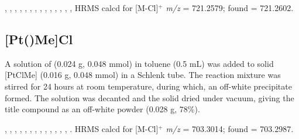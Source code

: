 \begin{sloppypar}
,
,
,
,
,
,
,
,
,
,
,
,
,
,
HRMS calcd for  [M-Cl]$^+$ \emph{m/z} = 721.2579; found = 721.2602.
\end{sloppypar}


\subsection*{[Pt(\tBuxantphos)Me]Cl}
%

A solution of \tBuxantphos{} (0.024 g, 0.048 mmol) in toluene (0.5 mL) was added to solid [PtClMe] (0.016 g, 0.048 mmol) in a Schlenk tube.  The reaction mixture was stirred for 24 hours at room temperature, during which, an off-white precipitate formed.  The solution was decanted and the   solid dried under vacuum, giving the title compound as an off-white powder (0.028 g, 78\%).

,
,
,
,
,
,
,
,
,
,
,
,
,
.
HRMS calcd for  [M-Cl]$^+$ \emph{m/z} = 703.3014; found = 703.2987.


